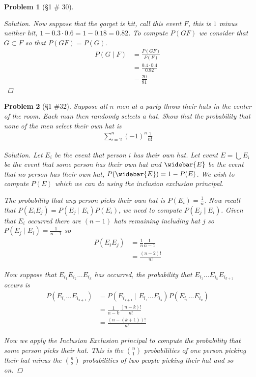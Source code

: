\documentclass[11pt, oneside]{book}   	%
\newtheorem{problem}{Problem}[chapter]
\begin{document}
\begin{spacing}{1.618}
\begin{problem}[\S 1 \# 30]
\begin{proof}[Solution]
		Now suppose that the garget is hit, call this event $F$, this is $1$ minus neither hit, $1-0.3\cdot 0.6 = 1-0.18 = 0.82$. To compute $P(GF)$ we consider that $G\subset F$ so that $P(GF)=P(G)$. 
		\begin{alignat*}{4}
			P(G\mid F) &= \frac{P(GF)}{P(F)} \\
				&=\frac{0.4\cdot 0.4}{0.82} \\
				&=\frac{20}{81}
		\end{alignat*}
	\end{proof}
\end{problem}

\begin{problem}[\S 1 \#32]
	Suppose all $n$ men at a party throw their hats in the center of the room. Each man then randomly selects a hat. Show that the probability that none of the men select their own hat is
	\begin{alignat}{4}
		\sum_{i=2}^n(-1)^n\frac{1}{n!}
	\end{alignat}
	\begin{proof}[Solution]
		Let $E_i$ be the event that person $i$ has their own hat. Let event $E=\bigcup E_i$ be the event that some person has their own hat and $\widebar{E}$ be the event that no person has their own hat, $P(\widebar{E})=1-P(E)$. We wish to compute $P(E)$ which we can do using the inclusion exclusion principal. 
		
		The probability that any person picks their own hat is $P(E_i)=\frac{1}{n}$. Now recall that $P(E_iE_j)=P(E_j\mid E_i)P(E_i)$, we need to compute $P(E_j\mid E_i)$. Given that $E_i$ occurred there are $(n-1)$ hats remaining including hat $j$ so $P(E_j\mid E_i)=\frac{1}{n-1}$ so 
		\begin{alignat*}{4}
			P(E_iE_j)&=\frac{1}{n}\frac{1}{n-1} \\
				&=\frac{(n-2)!}{n!}
		\end{alignat*}
		
		Now suppose that $E_{i_1}E_{i_2}\dots E_{i_k}$ has occurred, the probability that $E_{i_1} \dots E_{i_k}E_{i_{k+1}}$ occurs is 
		\begin{alignat*}{4}
			P(E_{i_1}\dots E_{i_{k+1}})&=P(E_{i_{k+1}}\mid E_{i_1}\dots E_{i_k})P(E_{i_1}\dots E_{i_k}) \\
				&=\frac{1}{n-k}\frac{(n-k)!}{n!} \\
				&=\frac{(n-(k+1))!}{n!}
		\end{alignat*}
		
		Now we apply the Inclusion Exclusion principal to compute the probability that some person picks their hat. This is the $\binom{n}{1}$ probabilities of one person picking their hat minus the $\binom{n}{2}$ probabilities of two people picking their hat and so on. 


\end{proof}
\end{problem}
\end{spacing}
\end{document}
